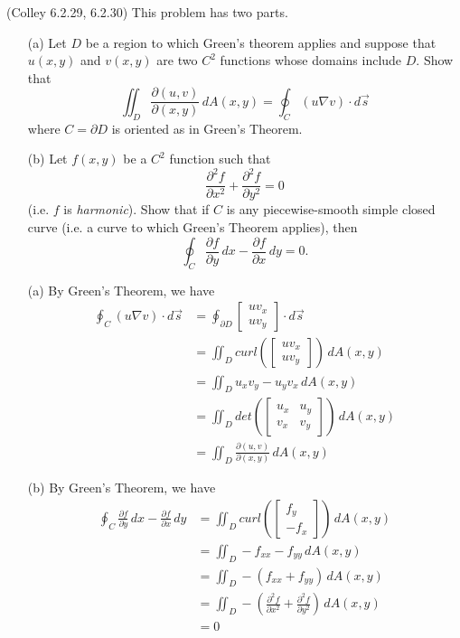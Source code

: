 \documentclass[11pt,letterpaper,cm]{nupset}
\newcommand{\bmat}[1]{\begin{bmatrix} #1 \end{bmatrix}}
\begin{document}
\begin{problem}[Exercise 8] (Colley 6.2.29, 6.2.30) This problem has two parts.
	\begin{itemize}
		\item[(a)] Let $D$ be a region to which Green's theorem applies and suppose that $u(x,y)$ and $v(x,y)$ are two $C^2$ functions whose domains include $D$. Show that
		$$\iint_D \frac{\partial(u,v)}{\partial(x,y)}\,dA(x,y) = \oint_C (u\nabla v)\cdot d\vec{s}$$
		where $C = \partial D$ is oriented as in Green's Theorem.
		\item[(b)] Let $f(x,y)$ be a $C^2$ function such that
		$$\frac{\partial^2f}{\partial x^2}+\frac{\partial^2f}{\partial y^2} = 0$$
		(i.e. $f$ is \textit{harmonic}). Show that if $C$ is any piecewise-smooth simple closed curve (i.e. a curve to which Green's Theorem applies), then
		$$\oint_C \frac{\partial f}{\partial y}\,dx-\frac{\partial f}{\partial x}\,dy = 0.$$
	\end{itemize}
\end{problem}
\begin{solution}
	\begin{itemize}
		\item[(a)] By Green's Theorem, we have
		\begin{align*}
			\oint_C (u\nabla v)\cdot d\vec{s}&=\oint_{\partial D} \bmat{uv_x\\uv_y}\cdot d\vec{s}\\
			&=\iint_D curl(\bmat{uv_x\\uv_y})\, dA(x,y)\\
			&=\iint_D u_xv_y-u_yv_x\, dA(x,y)\\
			&=\iint_D det(\bmat{u_x & u_y\\v_x & v_y})\, dA(x,y)\\
			&=\iint_D \frac{\partial(u,v)}{\partial(x,y)}\, dA(x,y)
		\end{align*}
		\item[(b)] By Green's Theorem, we have
		\begin{align*}
			\oint_C \frac{\partial f}{\partial y}\,dx-\frac{\partial f}{\partial x}\,dy &=\iint_D curl(\bmat{f_y\\-f_x})\, dA(x,y)\\
			&=\iint_D -f_{xx}-f_{yy}\, dA(x,y)\\
			&=\iint_D -(f_{xx}+f_{yy})\, dA(x,y)\\
			&=\iint_D -(\frac{\partial^2f}{\partial x^2}+\frac{\partial^2f}{\partial y^2})\, dA(x,y)\\
			&=0
		\end{align*}
	\end{itemize}
\end{solution}
\newpage
\end{document}
